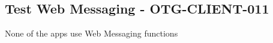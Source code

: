 \subsection{Test Web Messaging - OTG-CLIENT-011}
None of the apps use Web Messaging functions
\clearpage